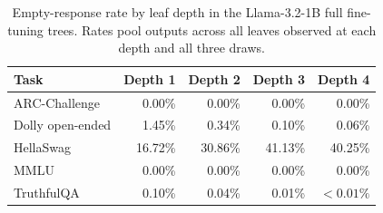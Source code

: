 \documentclass{article}
\theoremstyle{definition}
\theoremstyle{plain}
\begin{document}
\begin{table}[h]
\caption{Empty-response rate by leaf depth in the Llama-3.2-1B full fine-tuning trees. Rates
  pool outputs across all leaves observed at each depth and all three draws.}
\label{tab:eos-depth}
\centering
\small
\begin{tabular}{lrrrr}
\toprule
Task & Depth 1 & Depth 2 & Depth 3 & Depth 4 \\
\midrule
ARC-Challenge & 0.00\% & 0.00\% & 0.00\% & 0.00\% \\
Dolly open-ended & 1.45\% & 0.34\% & 0.10\% & 0.06\% \\
HellaSwag & 16.72\% & 30.86\% & 41.13\% & 40.25\% \\
MMLU & 0.00\% & 0.00\% & 0.00\% & 0.00\% \\
TruthfulQA & 0.10\% & 0.04\% & 0.01\% & $<0.01\%$ \\
\bottomrule
\end{tabular}
\end{table}
\end{document}
